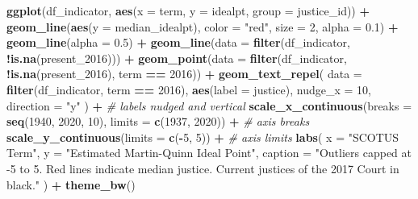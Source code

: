 \documentclass[]{book}
\newenvironment{Shaded}{\begin{snugshade}}{\end{snugshade}}
\newcommand{\CommentTok}[1]{\textcolor[rgb]{0.56,0.35,0.01}{\textit{#1}}}
\newcommand{\DataTypeTok}[1]{\textcolor[rgb]{0.13,0.29,0.53}{#1}}
\newcommand{\DecValTok}[1]{\textcolor[rgb]{0.00,0.00,0.81}{#1}}
\newcommand{\FloatTok}[1]{\textcolor[rgb]{0.00,0.00,0.81}{#1}}
\newcommand{\KeywordTok}[1]{\textcolor[rgb]{0.13,0.29,0.53}{\textbf{#1}}}
\newcommand{\NormalTok}[1]{#1}
\newcommand{\OperatorTok}[1]{\textcolor[rgb]{0.81,0.36,0.00}{\textbf{#1}}}
\newcommand{\StringTok}[1]{\textcolor[rgb]{0.31,0.60,0.02}{#1}}
\theoremstyle{definition}
\theoremstyle{definition}
\theoremstyle{definition}
\theoremstyle{remark}
\begin{document}
\begin{Shaded}
\begin{Highlighting}[]
\KeywordTok{ggplot}\NormalTok{(df_indicator, }\KeywordTok{aes}\NormalTok{(}\DataTypeTok{x =}\NormalTok{ term, }\DataTypeTok{y =}\NormalTok{ idealpt, }\DataTypeTok{group =}\NormalTok{ justice_id)) }\OperatorTok{+}
\StringTok{  }\KeywordTok{geom_line}\NormalTok{(}\KeywordTok{aes}\NormalTok{(}\DataTypeTok{y =}\NormalTok{ median_idealpt), }\DataTypeTok{color =} \StringTok{"red"}\NormalTok{, }\DataTypeTok{size =} \DecValTok{2}\NormalTok{, }\DataTypeTok{alpha =} \FloatTok{0.1}\NormalTok{) }\OperatorTok{+}
\StringTok{  }\KeywordTok{geom_line}\NormalTok{(}\DataTypeTok{alpha =} \FloatTok{0.5}\NormalTok{) }\OperatorTok{+}
\StringTok{  }\KeywordTok{geom_line}\NormalTok{(}\DataTypeTok{data =} \KeywordTok{filter}\NormalTok{(df_indicator, }\OperatorTok{!}\KeywordTok{is.na}\NormalTok{(present_}\DecValTok{2016}\NormalTok{))) }\OperatorTok{+}
\StringTok{  }\KeywordTok{geom_point}\NormalTok{(}\DataTypeTok{data =} \KeywordTok{filter}\NormalTok{(df_indicator, }\OperatorTok{!}\KeywordTok{is.na}\NormalTok{(present_}\DecValTok{2016}\NormalTok{), term }\OperatorTok{==}\StringTok{ }\DecValTok{2016}\NormalTok{)) }\OperatorTok{+}
\StringTok{  }\KeywordTok{geom_text_repel}\NormalTok{(}
    \DataTypeTok{data =} \KeywordTok{filter}\NormalTok{(df_indicator, term }\OperatorTok{==}\StringTok{ }\DecValTok{2016}\NormalTok{), }\KeywordTok{aes}\NormalTok{(}\DataTypeTok{label =}\NormalTok{ justice),}
    \DataTypeTok{nudge_x =} \DecValTok{10}\NormalTok{,}
    \DataTypeTok{direction =} \StringTok{"y"}
\NormalTok{  ) }\OperatorTok{+}\StringTok{ }\CommentTok{# labels nudged and vertical}
\StringTok{  }\KeywordTok{scale_x_continuous}\NormalTok{(}\DataTypeTok{breaks =} \KeywordTok{seq}\NormalTok{(}\DecValTok{1940}\NormalTok{, }\DecValTok{2020}\NormalTok{, }\DecValTok{10}\NormalTok{), }\DataTypeTok{limits =} \KeywordTok{c}\NormalTok{(}\DecValTok{1937}\NormalTok{, }\DecValTok{2020}\NormalTok{)) }\OperatorTok{+}\StringTok{ }\CommentTok{# axis breaks}
\StringTok{  }\KeywordTok{scale_y_continuous}\NormalTok{(}\DataTypeTok{limits =} \KeywordTok{c}\NormalTok{(}\OperatorTok{-}\DecValTok{5}\NormalTok{, }\DecValTok{5}\NormalTok{)) }\OperatorTok{+}\StringTok{ }\CommentTok{# axis limits}
\StringTok{  }\KeywordTok{labs}\NormalTok{(}
    \DataTypeTok{x =} \StringTok{"SCOTUS Term"}\NormalTok{,}
    \DataTypeTok{y =} \StringTok{"Estimated Martin-Quinn Ideal Point"}\NormalTok{,}
    \DataTypeTok{caption =} \StringTok{"Outliers capped at -5 to 5. Red lines indicate median justice. Current justices of the 2017 Court in black."}
\NormalTok{  ) }\OperatorTok{+}
\StringTok{  }\KeywordTok{theme_bw}\NormalTok{()}
\end{Highlighting}
\end{Shaded}
\end{document}
